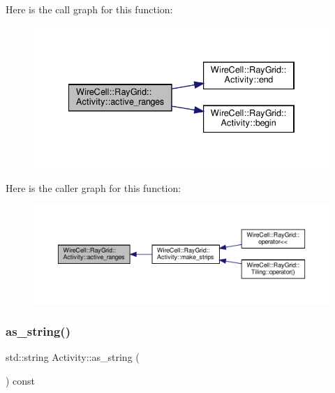 Here is the call graph for this function\+:
\nopagebreak
\begin{figure}[H]
\begin{center}
\leavevmode
\includegraphics[width=334pt]{class_wire_cell_1_1_ray_grid_1_1_activity_aae8ad1d5d95c9f5f4668975db2b68f3b_cgraph}
\end{center}
\end{figure}
Here is the caller graph for this function\+:
\nopagebreak
\begin{figure}[H]
\begin{center}
\leavevmode
\includegraphics[width=350pt]{class_wire_cell_1_1_ray_grid_1_1_activity_aae8ad1d5d95c9f5f4668975db2b68f3b_icgraph}
\end{center}
\end{figure}
\mbox{\label{class_wire_cell_1_1_ray_grid_1_1_activity_ad8e90c0bc1426818082926b28e280b50}} 
\subsubsection{\texorpdfstring{as\+\_\+string()}{as\_string()}}
{\footnotesize\ttfamily std\+::string Activity\+::as\+\_\+string (\begin{DoxyParamCaption}{ }\end{DoxyParamCaption}) const}



